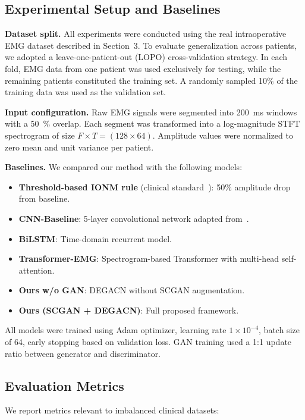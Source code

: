 \documentclass[10pt]{article}
\begin{document}
\subsection{Experimental Setup and Baselines}

\textbf{Dataset split.}
All experiments were conducted using the real intraoperative EMG dataset described in Section~3. 
To evaluate generalization across patients, we adopted a leave-one-patient-out (LOPO) cross-validation strategy. 
In each fold, EMG data from one patient was used exclusively for testing, while the remaining patients constituted the training set. 
A randomly sampled 10\% of the training data was used as the validation set.

\textbf{Input configuration.}
Raw EMG signals were segmented into \SI{200}{ms} windows with a \SI{50}{\percent} overlap. 
Each segment was transformed into a log-magnitude STFT spectrogram of size $F \times T = (128 \times 64)$. 
Amplitude values were normalized to zero mean and unit variance per patient.

\textbf{Baselines.}
We compared our method with the following models:

\begin{itemize}
    \item \textbf{Threshold-based IONM rule} (clinical standard~\cite{guntinas2018}): 50\% amplitude drop from baseline.
    \item \textbf{CNN-Baseline}: 5-layer convolutional network adapted from~\cite{RealTime_CNN_EMG_2019}.
    \item \textbf{BiLSTM}: Time-domain recurrent model.
    \item \textbf{Transformer-EMG}: Spectrogram-based Transformer with multi-head self-attention.
    \item \textbf{Ours w/o GAN}: DEGACN without SCGAN augmentation.
    \item \textbf{Ours (SCGAN + DEGACN)}: Full proposed framework.
\end{itemize}

All models were trained using Adam optimizer, learning rate $1 \times 10^{-4}$, batch size of 64, early stopping based on validation loss. 
GAN training used a 1:1 update ratio between generator and discriminator.

\subsection{Evaluation Metrics}

We report metrics relevant to imbalanced clinical datasets:
\end{document}
